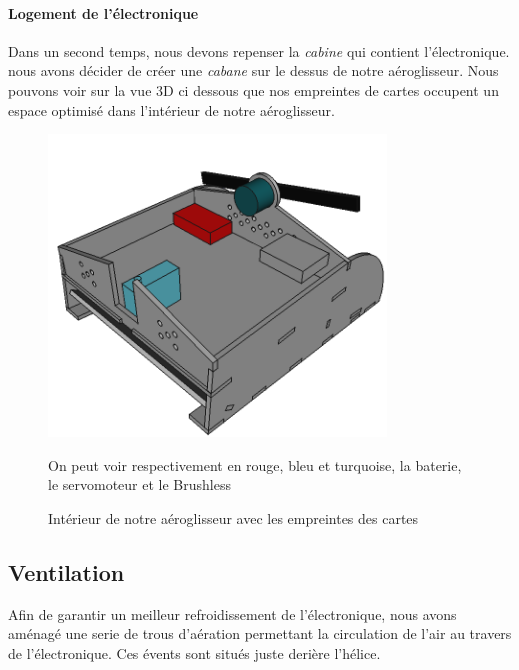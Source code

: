 \documentclass[a4paper,12pt]{book}
\begin{document}
				\paragraph{Logement de l'électronique} Dans un second temps, nous devons repenser la \textit{cabine} qui contient l'électronique. nous avons décider de créer une \textit{cabane} sur le dessus de notre aéroglisseur. Nous pouvons voir sur la vue 3D ci dessous que nos empreintes de cartes occupent un espace optimisé dans l'intérieur de notre aéroglisseur.
				\begin{figure}[h]
					\begin{center}
						\includegraphics[width=0.8\textwidth]{../Illus/vueInterne.png}
					\end{center}
					\caption{Intérieur de notre aéroglisseur avec les empreintes des cartes}
					On peut voir respectivement en rouge, bleu et turquoise, la baterie, le servomoteur et le Brushless
					\label{MEPChticat}
				\end{figure}
			\subsection{Ventilation}
			Afin de garantir un meilleur refroidissement de l'électronique, nous avons aménagé une serie de trous d'aération permettant la circulation de l'air au travers de l'électronique. Ces évents sont situés juste derière l'hélice.
\end{document}

